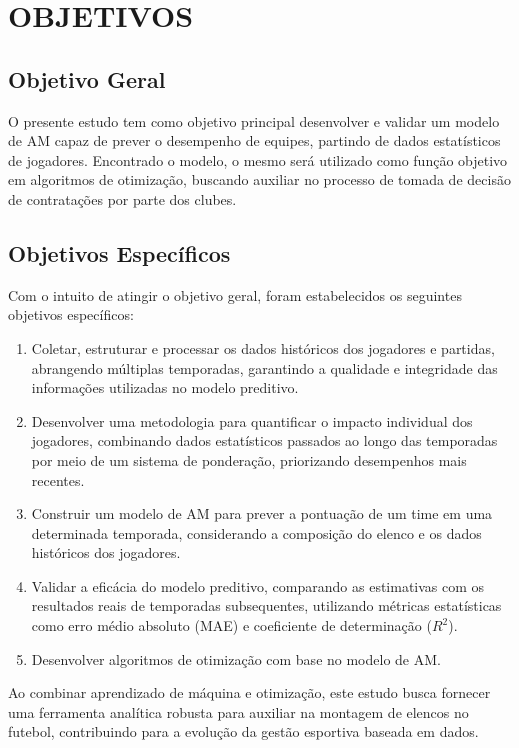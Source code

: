\chapter{OBJETIVOS}

\section{Objetivo Geral}

O presente estudo tem como objetivo principal desenvolver e validar um modelo de AM capaz de prever o desempenho de equipes, partindo de dados estatísticos de jogadores. Encontrado o modelo, o mesmo será utilizado como função objetivo em algoritmos de otimização, buscando auxiliar no processo de tomada de decisão de contratações por parte dos clubes.

\section{Objetivos Específicos}

Com o intuito de atingir o objetivo geral, foram estabelecidos os seguintes objetivos específicos:

\begin{enumerate}
    \item Coletar, estruturar e processar os dados históricos dos jogadores e partidas, abrangendo múltiplas temporadas, garantindo a qualidade e integridade das informações utilizadas no modelo preditivo.

    \item Desenvolver uma metodologia para quantificar o impacto individual dos jogadores, combinando dados estatísticos passados ao longo das temporadas por meio de um sistema de ponderação, priorizando desempenhos mais recentes.

    \item Construir um modelo de AM para prever a pontuação de um time em uma determinada temporada, considerando a composição do elenco e os dados históricos dos jogadores.

    \item Validar a eficácia do modelo preditivo, comparando as estimativas com os resultados reais de temporadas subsequentes, utilizando métricas estatísticas como erro médio absoluto (MAE) e coeficiente de determinação ($R^2$).

    \item Desenvolver algoritmos de otimização com base no modelo de AM.
    
\end{enumerate}

Ao combinar aprendizado de máquina e otimização, este estudo busca fornecer uma ferramenta analítica robusta para auxiliar na montagem de elencos no futebol, contribuindo para a evolução da gestão esportiva baseada em dados.